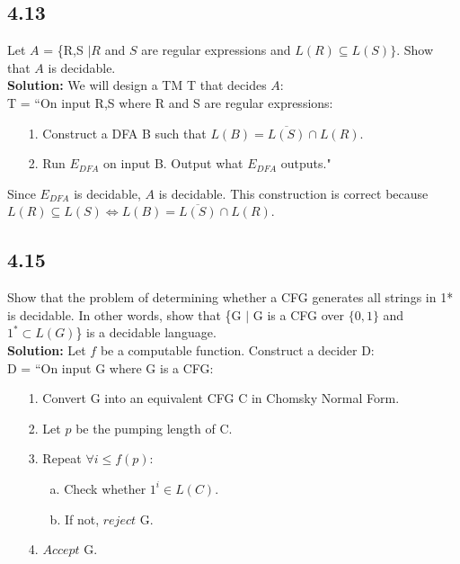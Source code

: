 \subsection*{4.13} Let $A$ = \{\textlangle{}R,S\textrangle{} $| R$ and $S$ are regular expressions and $L(R) \subseteq L(S)\}$. Show that $A$ is decidable.
\\
\textbf{Solution:} We will design a TM T that decides $A$:
\\
T = ``On input \textlangle{}R,S\textrangle{} where R and S are regular expressions:
\begin{enumerate}
\itemsep0em
\item[1.]Construct a DFA B such that $L(B) = \overline{L(S)} \cap L(R)$.
\item[2.]Run $E_{DFA}$ on input \textlangle{}B\textrangle{}. Output what $E_{DFA}$ outputs."
\end{enumerate}
Since $E_{DFA}$ is decidable, $A$ is decidable. This construction is correct because $L(R) \subseteq L(S) \Leftrightarrow L(B) = \overline{L(S)} \cap L(R)$.

\subsection*{4.15} Show that the problem of determining whether a CFG generates all strings in 1* is decidable. In other words, show that \{\textlangle{}G\textrangle{} $|$ G is a CFG over $\{0, 1\}$ and $1^* \subset L(G)$\} is a decidable language. 
\\
\textbf{Solution:} Let $f$ be a computable function. Construct a decider D:
\\
D = ``On input \textlangle{}G\textrangle{} where G is a CFG:
\begin{enumerate}
\itemsep0em
\item[1.]Convert G into an equivalent CFG C in Chomsky Normal Form.
\item[2.]Let $p$ be the pumping length of C.
\item[3.]Repeat $\forall i \le f(p)$:
\begin{enumerate}
\item[a.]Check whether $1^i \in L(C)$.
\item[b.]If not, $reject$ \textlangle{}G\textrangle{}.
\end{enumerate}
\item[4.]$Accept$ \textlangle{}G\textrangle{}.
\end{enumerate}
